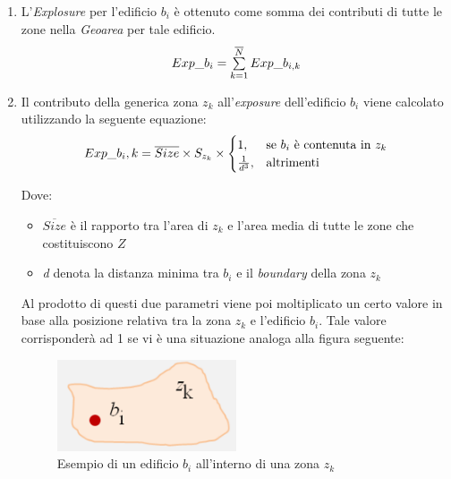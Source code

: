 \begin{enumerate}

\item L'\textit{Explosure} per l'edificio $b_i$ è ottenuto come somma dei contributi di tutte le zone nella \textit{Geoarea} per tale edificio.
\begin{equation}
\label{sum_exp_old}
 Exp$\_$b_i = \sum\limits_{k=1}^{\overline{N}}  Exp$\_$b_{i,k}
\end{equation}

\item Il contributo della generica zona $z_k$ all'\textit{exposure} dell'edificio $b_i$ viene calcolato utilizzando la seguente equazione:\newline
\begin{equation}
\label{equazioneVecchia}
Exp$\_$b_i,k = \overline{Size} \times S_{z_k} \times  \begin{cases}
               1,  & \text{se $b_i$ è contenuta in $z_k$}\\
               \frac{1}{d^3}, & \text{altrimenti}
            \end{cases} 
\end{equation}

Dove:
\begin{itemize}
\item \textit{$\overline{Size}$} è il rapporto tra l'area di $z_k$ e l'area media di tutte le zone che costituiscono $Z$
\item \textit{d} denota la distanza minima tra $b_i$ e il \textit{boundary} della zona $z_k$
\end{itemize}
Al prodotto di questi due parametri viene poi moltiplicato un certo valore in base alla posizione relativa tra la zona $z_k$ e l'edificio $b_i$. Tale valore corrisponderà ad 1 se vi è una situazione analoga alla figura seguente:

\begin{figure}[bth]
  \label{fig:stazDentro}
  \centering
    \includegraphics[width=0.5\textwidth]{img/stazDentro}
      \caption{Esempio di un edificio $b_i$ all'interno di una zona                    $z_k$}
\end{figure}


\end{enumerate}
